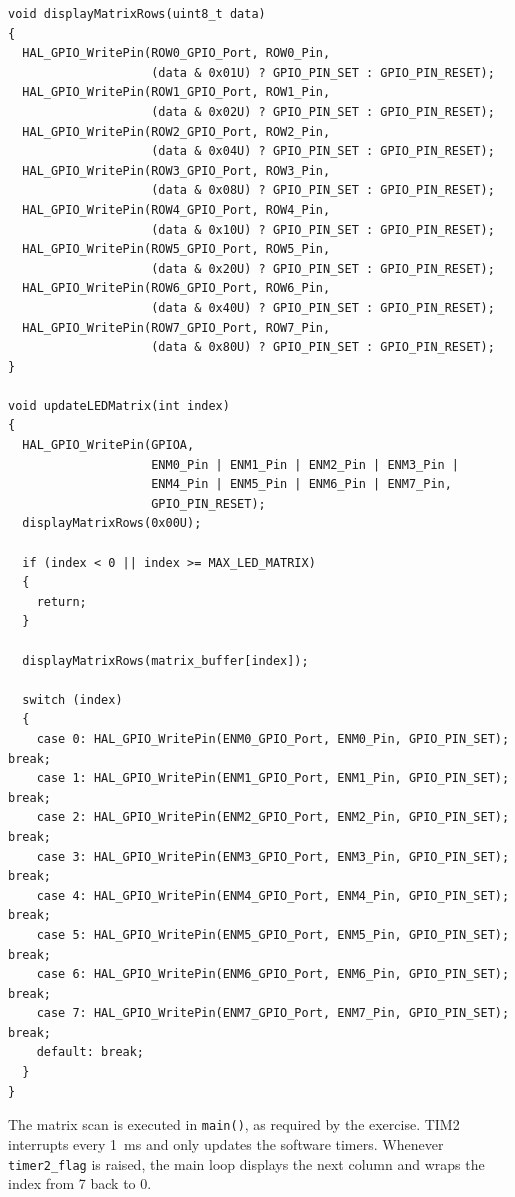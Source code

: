 \begin{lstlisting}[caption={Row-data output and column scanning for the LED matrix}]
void displayMatrixRows(uint8_t data)
{
  HAL_GPIO_WritePin(ROW0_GPIO_Port, ROW0_Pin,
                    (data & 0x01U) ? GPIO_PIN_SET : GPIO_PIN_RESET);
  HAL_GPIO_WritePin(ROW1_GPIO_Port, ROW1_Pin,
                    (data & 0x02U) ? GPIO_PIN_SET : GPIO_PIN_RESET);
  HAL_GPIO_WritePin(ROW2_GPIO_Port, ROW2_Pin,
                    (data & 0x04U) ? GPIO_PIN_SET : GPIO_PIN_RESET);
  HAL_GPIO_WritePin(ROW3_GPIO_Port, ROW3_Pin,
                    (data & 0x08U) ? GPIO_PIN_SET : GPIO_PIN_RESET);
  HAL_GPIO_WritePin(ROW4_GPIO_Port, ROW4_Pin,
                    (data & 0x10U) ? GPIO_PIN_SET : GPIO_PIN_RESET);
  HAL_GPIO_WritePin(ROW5_GPIO_Port, ROW5_Pin,
                    (data & 0x20U) ? GPIO_PIN_SET : GPIO_PIN_RESET);
  HAL_GPIO_WritePin(ROW6_GPIO_Port, ROW6_Pin,
                    (data & 0x40U) ? GPIO_PIN_SET : GPIO_PIN_RESET);
  HAL_GPIO_WritePin(ROW7_GPIO_Port, ROW7_Pin,
                    (data & 0x80U) ? GPIO_PIN_SET : GPIO_PIN_RESET);
}

void updateLEDMatrix(int index)
{
  HAL_GPIO_WritePin(GPIOA,
                    ENM0_Pin | ENM1_Pin | ENM2_Pin | ENM3_Pin |
                    ENM4_Pin | ENM5_Pin | ENM6_Pin | ENM7_Pin,
                    GPIO_PIN_RESET);
  displayMatrixRows(0x00U);

  if (index < 0 || index >= MAX_LED_MATRIX)
  {
    return;
  }

  displayMatrixRows(matrix_buffer[index]);

  switch (index)
  {
    case 0: HAL_GPIO_WritePin(ENM0_GPIO_Port, ENM0_Pin, GPIO_PIN_SET); break;
    case 1: HAL_GPIO_WritePin(ENM1_GPIO_Port, ENM1_Pin, GPIO_PIN_SET); break;
    case 2: HAL_GPIO_WritePin(ENM2_GPIO_Port, ENM2_Pin, GPIO_PIN_SET); break;
    case 3: HAL_GPIO_WritePin(ENM3_GPIO_Port, ENM3_Pin, GPIO_PIN_SET); break;
    case 4: HAL_GPIO_WritePin(ENM4_GPIO_Port, ENM4_Pin, GPIO_PIN_SET); break;
    case 5: HAL_GPIO_WritePin(ENM5_GPIO_Port, ENM5_Pin, GPIO_PIN_SET); break;
    case 6: HAL_GPIO_WritePin(ENM6_GPIO_Port, ENM6_Pin, GPIO_PIN_SET); break;
    case 7: HAL_GPIO_WritePin(ENM7_GPIO_Port, ENM7_Pin, GPIO_PIN_SET); break;
    default: break;
  }
}
\end{lstlisting}

The matrix scan is executed in \texttt{main()}, as required by the exercise.
TIM2 interrupts every \SI{1}{ms} and only updates the software timers. Whenever
\texttt{timer2\_flag} is raised, the main loop displays the next column and
wraps the index from 7 back to 0.

